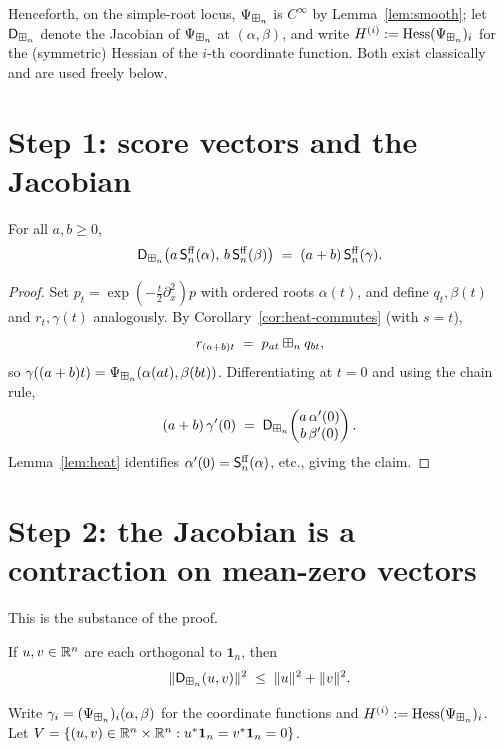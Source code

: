 \noindent Henceforth, on the simple-root locus, $\Psi_{\boxplus_n}$ is $C^\infty$ by
Lemma~\ref{lem:smooth}; let $\mathsf{D}_{\boxplus_n}$ denote the Jacobian of $\Psi_{\boxplus_n}$ at
$(\alpha,\beta)$, and write $H^{(i)}:=\operatorname{Hess}(\Psi_{\boxplus_n})_i$ for the
(symmetric) Hessian of the $i$-th coordinate function. Both exist classically and
are used freely below.

\section*{Step 1: score vectors and the Jacobian}

\begin{qfourobservation}\label{obs:scores}
For all $a,b\ge0$,
\[
\mathsf{D}_{\boxplus_n}\bigl(a\,\mathsf{S}^{\mathrm{ff}}_n(\alpha),\,b\,\mathsf{S}^{\mathrm{ff}}_n(\beta)\bigr)\;=\;(a+b)\,\mathsf{S}^{\mathrm{ff}}_n(\gamma).
\]
\end{qfourobservation}

\begin{proof}
Set $p_t=\exp(-\tfrac t2\partial_x^2)p$ with ordered roots $\alpha(t)$, and
define $q_t,\beta(t)$ and $r_t,\gamma(t)$ analogously.
By Corollary~\ref{cor:heat-commutes} (with $s=t$),
\[
r_{(a+b)t}\;=\;p_{at}\boxplus_n q_{bt},
\]
so $\gamma((a+b)t)=\Psi_{\boxplus_n}(\alpha(at),\beta(bt))$. Differentiating at
$t=0$ and using the chain rule,
\[
(a+b)\,\gamma'(0)\;=\;\mathsf{D}_{\boxplus_n}\!\begin{pmatrix} a\,\alpha'(0)\\ b\,\beta'(0)\end{pmatrix}.
\]
Lemma~\ref{lem:heat} identifies $\alpha'(0)=\mathsf{S}^{\mathrm{ff}}_n(\alpha)$, etc., giving the
claim.
\end{proof}

\section*{Step 2: the Jacobian is a contraction on mean-zero vectors}

This is the substance of the proof.

\begin{qfourproposition}\label{prop:contraction}
If $u,v\in\mathbb{R}^n$ are each orthogonal to $\mathbf 1_n$, then
\[
\|\mathsf{D}_{\boxplus_n}(u,v)\|^2\;\le\;\|u\|^2+\|v\|^2.
\]
\end{qfourproposition}

Write $\gamma_i=(\Psi_{\boxplus_n})_i(\alpha,\beta)$ for the coordinate functions and
$H^{(i)}:=\operatorname{Hess}(\Psi_{\boxplus_n})_i$. Let
$V=\{(u,v)\in\mathbb{R}^n\times\mathbb{R}^n:u^\ast\mathbf 1_n=v^\ast\mathbf 1_n=0\}$.

